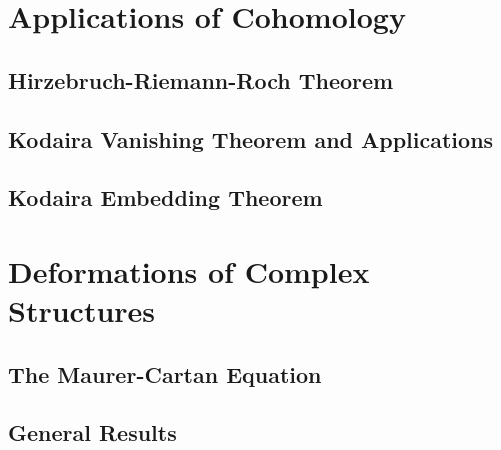 \documentclass[oneside]{amsbook}
\numberwithin{ex}{section}
\begin{document}
\chapter{Applications of Cohomology}
\section{Hirzebruch-Riemann-Roch Theorem}

\section{Kodaira Vanishing Theorem and Applications}

\section{Kodaira Embedding Theorem}


\chapter{Deformations of Complex Structures}
\section{The Maurer-Cartan Equation}

\section{General Results}

\end{document}
